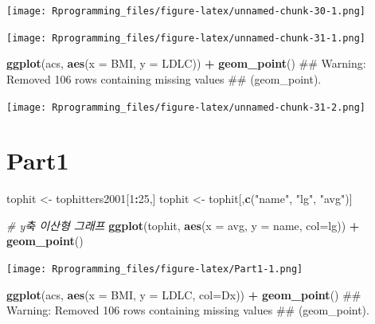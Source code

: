 \documentclass[10pt,]{krantz}
\makeatletter
\newenvironment{Shaded}{\begin{snugshade}}{\end{snugshade}}
\newcommand{\KeywordTok}[1]{\textcolor[rgb]{0.13,0.29,0.53}{\textbf{#1}}}
\newcommand{\DataTypeTok}[1]{\textcolor[rgb]{0.13,0.29,0.53}{#1}}
\newcommand{\DecValTok}[1]{\textcolor[rgb]{0.00,0.00,0.81}{#1}}
\newcommand{\StringTok}[1]{\textcolor[rgb]{0.31,0.60,0.02}{#1}}
\newcommand{\CommentTok}[1]{\textcolor[rgb]{0.56,0.35,0.01}{\textit{#1}}}
\newcommand{\OperatorTok}[1]{\textcolor[rgb]{0.81,0.36,0.00}{\textbf{#1}}}
\newcommand{\NormalTok}[1]{#1}
\newenvironment{kframe}{%
\medskip{}
\setlength{\fboxsep}{.8em}
 \def\at@end@of@kframe{}%
 \ifinner\ifhmode%
  \def\at@end@of@kframe{\end{minipage}}%
  \begin{minipage}{\columnwidth}%
 \fi\fi%
 \def\FrameCommand##1{\hskip\@totalleftmargin \hskip-\fboxsep
 \colorbox{shadecolor}{##1}\hskip-\fboxsep
     \hskip-\linewidth \hskip-\@totalleftmargin \hskip\columnwidth}%
 \MakeFramed {\advance\hsize-\width
   \@totalleftmargin\z@ \linewidth\hsize
   \@setminipage}}%
 {\par\unskip\endMakeFramed%
 \at@end@of@kframe}
\renewenvironment{Shaded}{\begin{kframe}}{\end{kframe}}
\theoremstyle{definition}
\theoremstyle{definition}
\theoremstyle{remark}
\makeatother
\begin{document}
\texttt{[image: Rprogramming\_files/figure-latex/unnamed-chunk-30-1.png]}

\begin{Shaded}
\end{Shaded}

\texttt{[image: Rprogramming\_files/figure-latex/unnamed-chunk-31-1.png]}

\begin{Shaded}
\begin{Highlighting}[]
\KeywordTok{ggplot}\NormalTok{(acs, }\KeywordTok{aes}\NormalTok{(}\DataTypeTok{x =}\NormalTok{ BMI, }\DataTypeTok{y =}\NormalTok{ LDLC)) }\OperatorTok{+}\StringTok{ }\KeywordTok{geom_point}\NormalTok{()}
\NormalTok{## Warning: Removed 106 rows containing missing values}
\NormalTok{## (geom_point).}
\end{Highlighting}
\end{Shaded}

\texttt{[image: Rprogramming\_files/figure-latex/unnamed-chunk-31-2.png]}

\section{Part1}\label{part1}

\begin{Shaded}
\begin{Highlighting}[]
\NormalTok{tophit <-}\StringTok{ }\NormalTok{tophitters2001[}\DecValTok{1}\OperatorTok{:}\DecValTok{25}\NormalTok{,]}
\NormalTok{tophit <-}\StringTok{ }\NormalTok{tophit[,}\KeywordTok{c}\NormalTok{(}\StringTok{"name"}\NormalTok{, }\StringTok{"lg"}\NormalTok{, }\StringTok{"avg"}\NormalTok{)]}

\CommentTok{# y축 이산형 그래프 }
\KeywordTok{ggplot}\NormalTok{(tophit, }\KeywordTok{aes}\NormalTok{(}\DataTypeTok{x =}\NormalTok{ avg, }\DataTypeTok{y =}\NormalTok{ name, }\DataTypeTok{col=}\NormalTok{lg)) }\OperatorTok{+}\StringTok{ }\KeywordTok{geom_point}\NormalTok{()}
\end{Highlighting}
\end{Shaded}

\texttt{[image: Rprogramming\_files/figure-latex/Part1-1.png]}

\begin{Shaded}
\begin{Highlighting}[]

\KeywordTok{ggplot}\NormalTok{(acs, }\KeywordTok{aes}\NormalTok{(}\DataTypeTok{x =}\NormalTok{ BMI, }\DataTypeTok{y =}\NormalTok{ LDLC, }\DataTypeTok{col=}\NormalTok{Dx)) }\OperatorTok{+}\StringTok{ }\KeywordTok{geom_point}\NormalTok{()}
\NormalTok{## Warning: Removed 106 rows containing missing values}
\NormalTok{## (geom_point).}
\end{Highlighting}
\end{Shaded}
\end{document}
